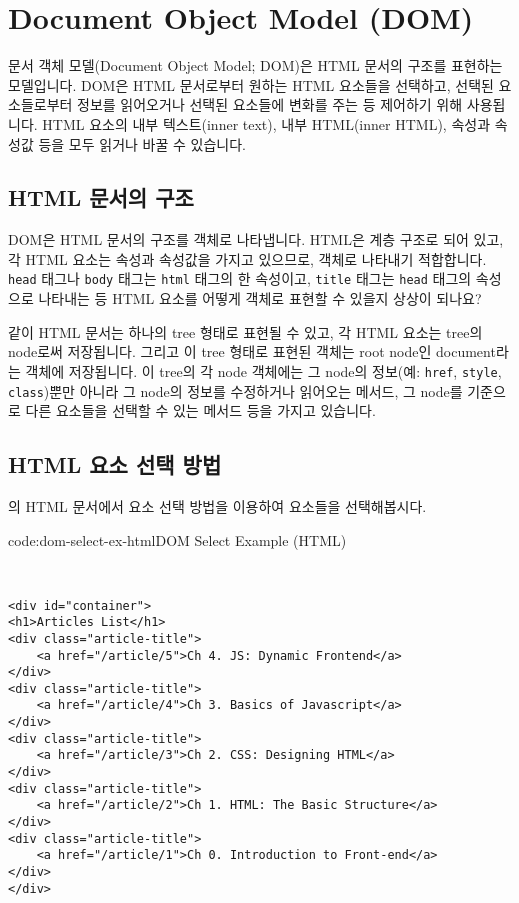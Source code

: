 \section{Document Object Model (DOM)} \label{sect:document-object-model}

문서 객체 모델(Document Object Model; DOM)은 HTML 문서의 구조를 표현하는 모델입니다. DOM은 HTML 문서로부터 원하는 HTML 요소들을 선택하고, 선택된 요소들로부터 정보를 읽어오거나 선택된 요소들에 변화를 주는 등 제어하기 위해 사용됩니다. HTML 요소의 내부 텍스트(inner text), 내부 HTML(inner HTML), 속성과 속성값 등을 모두 읽거나 바꿀 수 있습니다. 

\subsection*{HTML 문서의 구조}

DOM은 HTML 문서의 구조를 객체로 나타냅니다. HTML은 계층 구조로 되어 있고, 각 HTML 요소는 속성과 속성값을 가지고 있으므로, 객체로 나타내기 적합합니다. \texttt{head} 태그나 \texttt{body} 태그는 \texttt{html} 태그의 한 속성이고, \texttt{title} 태그는 \texttt{head} 태그의 속성으로 나타내는 등 HTML 요소를 어떻게 객체로 표현할 수 있을지 상상이 되나요?

    {}

\와 같이 HTML 문서는 하나의 tree 형태로 표현될 수 있고, 각 HTML 요소는 tree의 node로써 저장됩니다. 그리고 이 tree 형태로 표현된 객체는 root node인 document라는 객체에 저장됩니다. 이 tree의 각 node 객체에는 그 node의 정보(예: \texttt{href}, \texttt{style}, \texttt{class})뿐만 아니라 그 node의 정보를 수정하거나 읽어오는 메서드, 그 node를 기준으로 다른 요소들을 선택할 수 있는 메서드 등을 가지고 있습니다. 

\subsection*{HTML 요소 선택 방법}

의 HTML 문서에서 요소 선택 방법을 이용하여 요소들을 선택해봅시다.

\begin{codeenv}{code:dom-select-ex-html}{DOM Select Example (HTML)}\begin{verbatim}


<div id="container">
<h1>Articles List</h1>
<div class="article-title">
    <a href="/article/5">Ch 4. JS: Dynamic Frontend</a>
</div>
<div class="article-title">
    <a href="/article/4">Ch 3. Basics of Javascript</a>
</div>
<div class="article-title">
    <a href="/article/3">Ch 2. CSS: Designing HTML</a>
</div>
<div class="article-title">
    <a href="/article/2">Ch 1. HTML: The Basic Structure</a>
</div>
<div class="article-title">
    <a href="/article/1">Ch 0. Introduction to Front-end</a>
</div>
</div>
\end{verbatim}
\end{codeenv}

